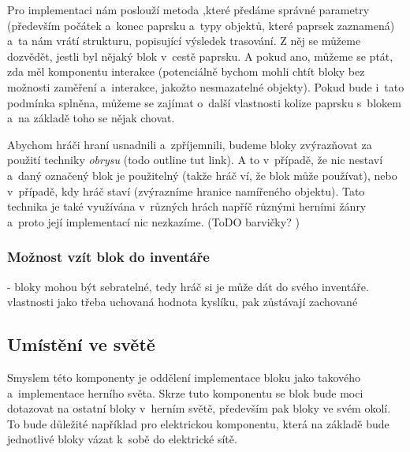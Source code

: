 Pro implementaci nám poslouží metoda ,\linebreak které předáme správné parametry (především počátek a~konec paprsku a~typy objektů, které paprsek zaznamená) a~ta nám vrátí strukturu, popisující výsledek trasování. Z něj se můžeme dozvědět, jestli byl nějaký blok v~cestě paprsku. A pokud ano, můžeme se ptát, zda měl komponentu interakce (potenciálně bychom mohli chtít bloky bez možnosti zaměření a~interakce, jakožto nesmazatelné objekty). Pokud bude i~tato podmínka splněna, můžeme se zajímat o~další vlastnosti kolize paprsku s~blokem a~na základě toho se nějak chovat.

Abychom hráči hraní usnadnili a~zpříjemnili, budeme bloky zvýrazňovat za použití techniky \textit{obrysu} (todo outline tut link). A to v~případě, že nic nestaví a~daný označený blok je použitelný (takže hráč ví, že blok může používat), nebo v~případě, kdy hráč staví (zvýrazníme hranice namířeného objektu). Tato technika je také využívána v~různých hrách napříč různými herními žánry a~proto její implementací nic nezkazíme. (ToDO barvičky? )


\subsubsection{Možnost vzít blok do inventáře}

- bloky mohou být sebratelné, tedy hráč si je může dát do svého inventáře. vlastnosti jako třeba uchovaná hodnota kyslíku, pak zůstávají zachované

\subsection{Umístění ve světě}

Smyslem této komponenty je oddělení implementace bloku jako takového a~implementace herního světa. Skrze tuto komponentu se blok bude moci dotazovat na ostatní bloky v~herním světě, především pak bloky ve svém okolí. To bude důležité například pro elektrickou komponentu, která na základě  bude jednotlivé bloky vázat k~sobě do elektrické sítě.







